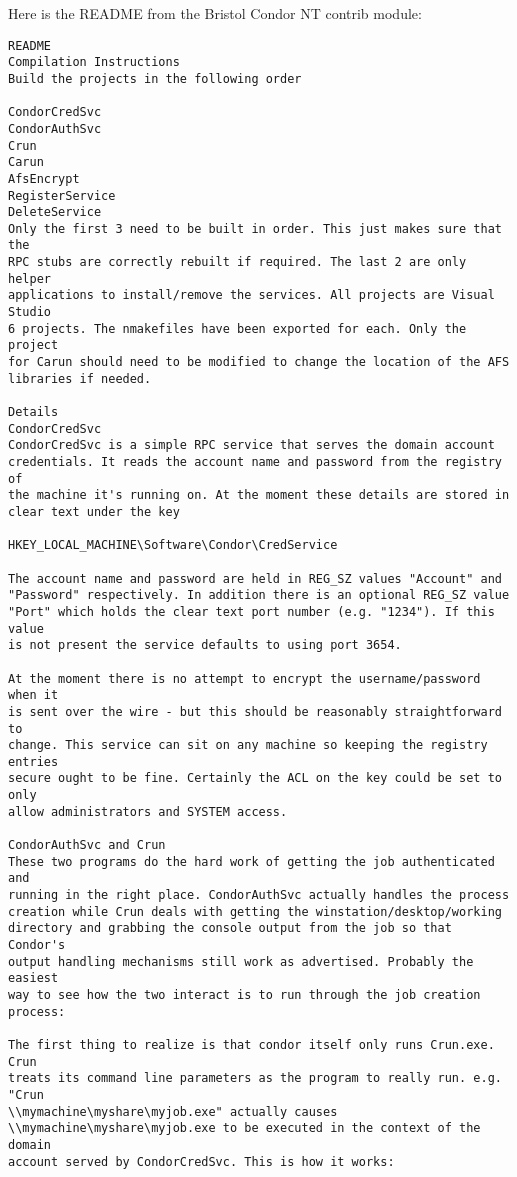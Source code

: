 Here is the README from the Bristol Condor NT contrib module:

\begin{verbatim}
README
Compilation Instructions
Build the projects in the following order

CondorCredSvc
CondorAuthSvc
Crun
Carun
AfsEncrypt
RegisterService
DeleteService
Only the first 3 need to be built in order. This just makes sure that the 
RPC stubs are correctly rebuilt if required. The last 2 are only helper 
applications to install/remove the services. All projects are Visual Studio 
6 projects. The nmakefiles have been exported for each. Only the project 
for Carun should need to be modified to change the location of the AFS 
libraries if needed.

Details
CondorCredSvc
CondorCredSvc is a simple RPC service that serves the domain account 
credentials. It reads the account name and password from the registry of 
the machine it's running on. At the moment these details are stored in 
clear text under the key

HKEY_LOCAL_MACHINE\Software\Condor\CredService

The account name and password are held in REG_SZ values "Account" and 
"Password" respectively. In addition there is an optional REG_SZ value 
"Port" which holds the clear text port number (e.g. "1234"). If this value 
is not present the service defaults to using port 3654.

At the moment there is no attempt to encrypt the username/password when it 
is sent over the wire - but this should be reasonably straightforward to 
change. This service can sit on any machine so keeping the registry entries 
secure ought to be fine. Certainly the ACL on the key could be set to only 
allow administrators and SYSTEM access.

CondorAuthSvc and Crun
These two programs do the hard work of getting the job authenticated and 
running in the right place. CondorAuthSvc actually handles the process 
creation while Crun deals with getting the winstation/desktop/working 
directory and grabbing the console output from the job so that Condor's 
output handling mechanisms still work as advertised. Probably the easiest 
way to see how the two interact is to run through the job creation process:

The first thing to realize is that condor itself only runs Crun.exe. Crun 
treats its command line parameters as the program to really run. e.g. "Crun 
\\mymachine\myshare\myjob.exe" actually causes 
\\mymachine\myshare\myjob.exe to be executed in the context of the domain 
account served by CondorCredSvc. This is how it works:


\end{verbatim}
